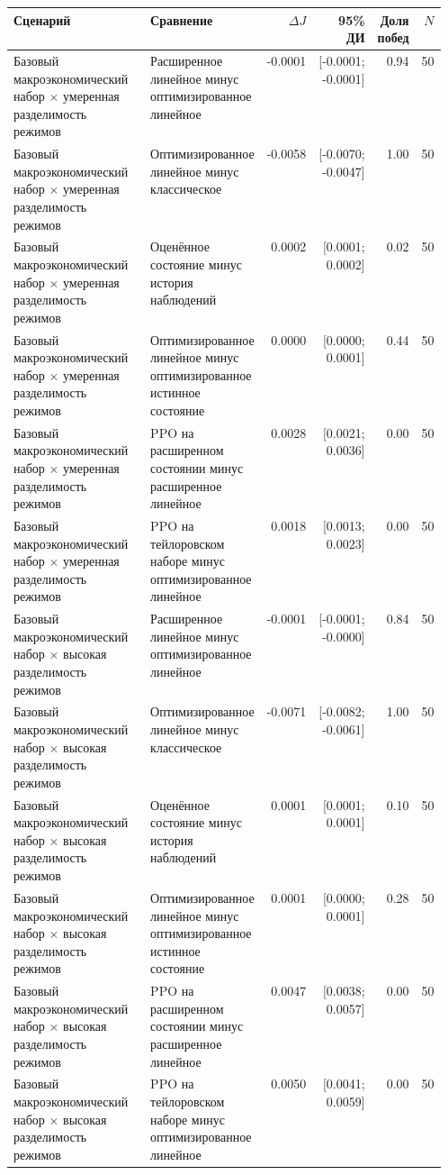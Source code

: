 \begin{tabular}{p{0.32\linewidth}p{0.24\linewidth}rrrr}
\toprule
Сценарий & Сравнение & $\Delta J$ & 95\% ДИ & Доля побед & $N$ \\
\midrule
Базовый макроэкономический набор × умеренная разделимость режимов & Расширенное линейное минус оптимизированное линейное & -0.0001 & [-0.0001; -0.0001] & 0.94 & 50 \\
Базовый макроэкономический набор × умеренная разделимость режимов & Оптимизированное линейное минус классическое & -0.0058 & [-0.0070; -0.0047] & 1.00 & 50 \\
Базовый макроэкономический набор × умеренная разделимость режимов & Оценённое состояние минус история наблюдений & 0.0002 & [0.0001; 0.0002] & 0.02 & 50 \\
Базовый макроэкономический набор × умеренная разделимость режимов & Оптимизированное линейное минус оптимизированное истинное состояние & 0.0000 & [0.0000; 0.0001] & 0.44 & 50 \\
Базовый макроэкономический набор × умеренная разделимость режимов & PPO на расширенном состоянии минус расширенное линейное & 0.0028 & [0.0021; 0.0036] & 0.00 & 50 \\
Базовый макроэкономический набор × умеренная разделимость режимов & PPO на тейлоровском наборе минус оптимизированное линейное & 0.0018 & [0.0013; 0.0023] & 0.00 & 50 \\
Базовый макроэкономический набор × высокая разделимость режимов & Расширенное линейное минус оптимизированное линейное & -0.0001 & [-0.0001; -0.0000] & 0.84 & 50 \\
Базовый макроэкономический набор × высокая разделимость режимов & Оптимизированное линейное минус классическое & -0.0071 & [-0.0082; -0.0061] & 1.00 & 50 \\
Базовый макроэкономический набор × высокая разделимость режимов & Оценённое состояние минус история наблюдений & 0.0001 & [0.0001; 0.0001] & 0.10 & 50 \\
Базовый макроэкономический набор × высокая разделимость режимов & Оптимизированное линейное минус оптимизированное истинное состояние & 0.0001 & [0.0000; 0.0001] & 0.28 & 50 \\
Базовый макроэкономический набор × высокая разделимость режимов & PPO на расширенном состоянии минус расширенное линейное & 0.0047 & [0.0038; 0.0057] & 0.00 & 50 \\
Базовый макроэкономический набор × высокая разделимость режимов & PPO на тейлоровском наборе минус оптимизированное линейное & 0.0050 & [0.0041; 0.0059] & 0.00 & 50 \\

\end{tabular}
